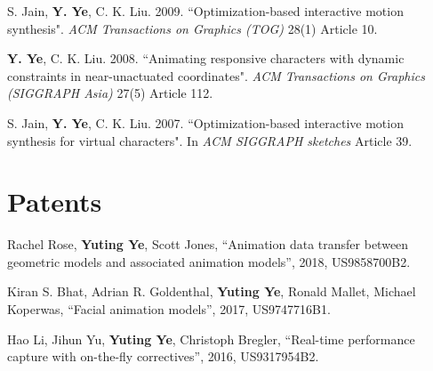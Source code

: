 \documentclass[margin,line]{res}
\begin{document}
\begin{resume}
\vspace*{-.1in}
S. Jain, {\bf Y. Ye}, C. K. Liu. 2009. ``Optimization-based interactive motion synthesis". {\em ACM Transactions on Graphics (TOG)} 28(1)  Article 10. 

\vspace*{-.1in}
{\bf Y. Ye}, C. K. Liu. 2008. ``Animating responsive characters with dynamic constraints in near-unactuated coordinates".  {\em ACM Transactions on Graphics (SIGGRAPH Asia)} 27(5) Article 112. %

\vspace*{-.1in}
S. Jain, {\bf Y. Ye}, C. K. Liu. 2007. ``Optimization-based interactive motion synthesis for virtual characters". In {\em ACM SIGGRAPH sketches} Article 39. 


\section{\sc Patents}
Rachel Rose, {\bf Yuting Ye}, Scott Jones, ``Animation data transfer between geometric models and associated animation models'', 2018, US9858700B2. 

\vspace*{-.1in}
Kiran S. Bhat, Adrian R. Goldenthal, {\bf Yuting Ye}, Ronald Mallet, Michael Koperwas, ``Facial animation models'', 2017, US9747716B1.  

\vspace*{-.1in}
Hao Li, Jihun Yu, {\bf Yuting Ye}, Christoph Bregler, ``Real-time performance capture with on-the-fly correctives'', 2016, US9317954B2.





\end{resume}
\end{document}
